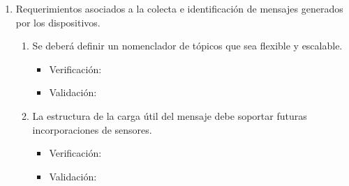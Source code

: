 \documentclass[
11pt, %
]{charter}
\begin{document}
\begin{enumerate}
	\item Requerimientos asociados a la colecta e identificación de mensajes generados por los dispositivos.
		\begin{enumerate}
			\item Se deberá definir un nomenclador de tópicos que sea flexible y escalable.
			\begin{itemize}
				\item Verificación:
				\item Validación: 
			\end{itemize}
			\item La estructura de la carga útil del mensaje debe soportar futuras  incorporaciones de sensores.
			\begin{itemize}
				\item Verificación:
				\item Validación: 
			\end{itemize}
		\end{enumerate}


\end{enumerate}
\end{document}
